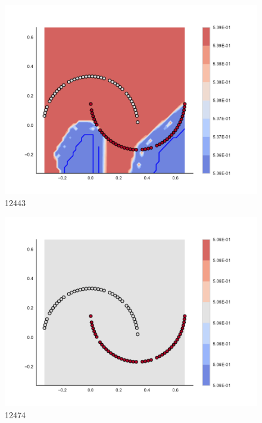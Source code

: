 \begin{subfigure}[b]{0.09\textwidth}
    \includegraphics[clip, trim=2.35cm 1.75cm 4.5cm 0cm,width=\textwidth]{img/convergence/12443.pdf}
    \caption{12443}
    \label{fig:convergence_12443}
\end{subfigure}
%
\begin{subfigure}[b]{0.09\textwidth}
    \includegraphics[clip, trim=2.35cm 1.75cm 4.5cm 0cm,width=\textwidth]{img/convergence/12474.pdf}
    \caption{12474}
    \label{fig:convergence_12474}
\end{subfigure}
%

